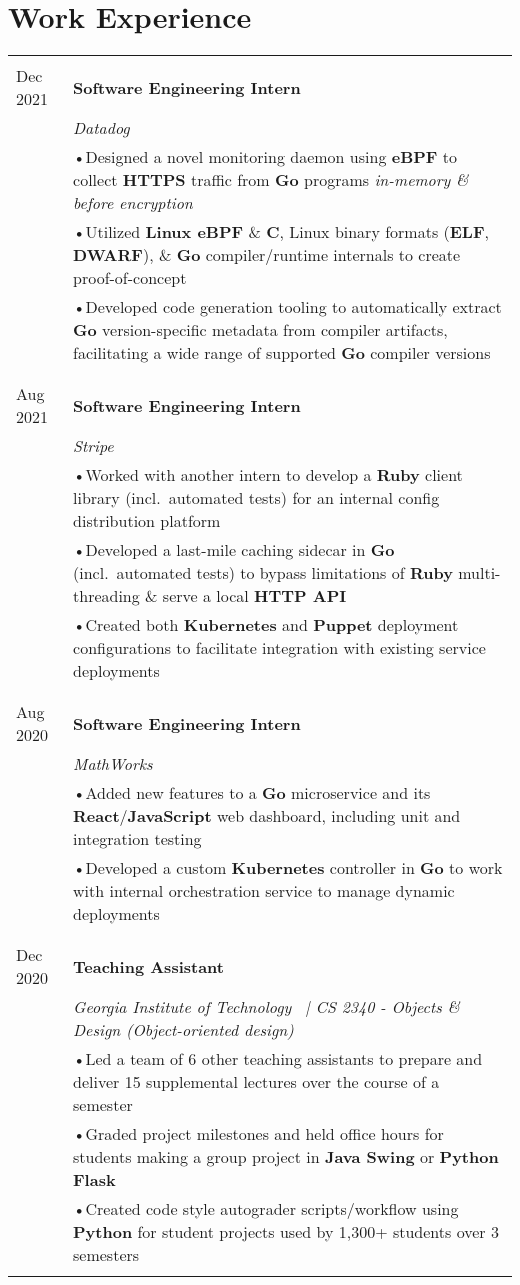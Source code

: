 \documentclass[a4paper,11pt]{article}
\newenvironment{rsection}[1]
  {
    \section{#1}
    \begin{tabular}{>{\raggedleft\arraybackslash}p{\lcolwidth}|p{\rcolwidth}}
   } {
    \\\multicolumn{2}{c}{} \\[-10pt]
    \end{tabular}
  }
\newcommand{\rheader}[2]{
    \multirow[t]{2}{*}{
        \begin{minipage}[t]{\dimexpr \lcolwidth - 0.1cm}
            \begin{flushright}
                \textsc{#1}
            \end{flushright}
        \end{minipage}
    } & \textbf{#2}
}
\newcommand{\rdesc}[1]{
  \\[-2pt]&\small{\emph{#1}\vspace{1pt} }
}
\newcommand{\ritem}[2][ •\hspace{3pt}]{\\[-2pt]& \footnotesize{#1#2}}
\newcommand{\rskip}{\\\multicolumn{2}{c}{} \\[\subsectionvspace]}
\begin{document}
\begin{rsection}{Work Experience}
  \rheader{Aug 2021 -\\[-1pt] Dec 2021}{Software Engineering Intern}
  \rdesc{Datadog}
  \ritem{Designed a novel monitoring daemon using \textbf{eBPF}
    to collect \textbf{HTTPS} traffic from \textbf{Go} programs \textit{in-memory \& before encryption}}
  \ritem{Utilized \textbf{Linux eBPF} \& \textbf{C}, Linux binary formats (\textbf{ELF}, \textbf{DWARF}),
    \& \textbf{Go} compiler/runtime internals to create proof-of-concept}
  \ritem{Developed code generation tooling to automatically extract \textbf{Go} version-specific
    metadata from compiler artifacts, facilitating a wide range of supported \textbf{Go} compiler versions}
  \rskip

  \rheader{May 2021 -\\[-1pt] Aug 2021}{Software Engineering Intern}
  \rdesc{Stripe}
  \ritem{Worked with another intern to develop a \textbf{Ruby} client library (incl.\ automated tests)
    for an internal config distribution platform}
  \ritem{Developed a last-mile caching sidecar in \textbf{Go} (incl.\ automated tests) to
    bypass limitations of \textbf{Ruby} multi-threading \& serve a local \textbf{HTTP API}}
  \ritem{Created both \textbf{Kubernetes} and \textbf{Puppet} deployment
    configurations to facilitate integration with existing service deployments}
  \rskip

  \rheader{May 2020 -\\[-1pt] Aug 2020}{Software Engineering Intern}
  \rdesc{MathWorks}
  \ritem{Added new features to a \textbf{Go} microservice
    and its \textbf{React}/\textbf{JavaScript} web dashboard, including unit and integration testing}
  \ritem{Developed a custom \textbf{Kubernetes} controller
    in \textbf{Go} to work with internal orchestration service to manage dynamic deployments}
  \rskip

  \rheader{Aug 2019 -\\[-1pt] Dec 2020}{Teaching Assistant}
  \rdesc{Georgia Institute of Technology \ {\normalfont |}\hspace{2pt}
    CS 2340 - Objects \& Design (Object-oriented design)}
  \ritem{Led a team of 6 other teaching assistants to prepare and deliver 15 supplemental lectures
    over the course of a semester}
  \ritem{Graded project milestones and held office hours for students
    making a group project in \textbf{Java Swing} or \textbf{Python Flask}}
  \ritem{Created code style autograder scripts/workflow using \textbf{Python}
    for student projects used by 1,300+ students over 3 semesters}
\end{rsection}
\vspace{\sectionvspace}
\end{document}
